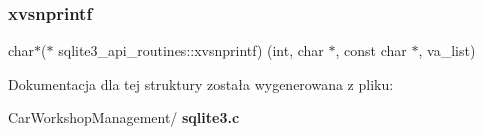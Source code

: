 \subsubsection{xvsnprintf}
{\footnotesize\ttfamily char$\ast$($\ast$ sqlite3\+\_\+api\+\_\+routines\+::xvsnprintf) (int, char $\ast$, const char $\ast$, va\+\_\+list)}



Dokumentacja dla tej struktury została wygenerowana z pliku\+:\begin{DoxyCompactItemize}
\item 
Car\+Workshop\+Management/\textbf{ sqlite3.\+c}\end{DoxyCompactItemize}

